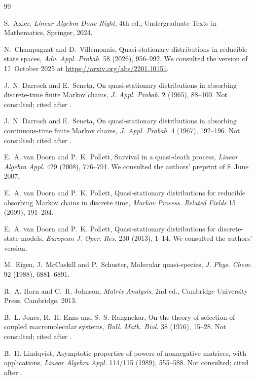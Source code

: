 \documentclass[11pt]{article}
\theoremstyle{definition}
\theoremstyle{remark}
\begin{document}
\begin{thebibliography}{99}

S.~Axler,
\emph{Linear Algebra Done Right}, 4th ed.,
Undergraduate Texts in Mathematics, Springer, 2024.

N.~Champagnat and D.~Villemonais,
Quasi-stationary distributions in reducible state spaces,
\emph{Adv. Appl. Probab.} 58 (2026), 956--992.
We consulted the version of 17~October 2025 at \url{https://arxiv.org/abs/2201.10151}.

J.~N. Darroch and E.~Seneta,
On quasi-stationary distributions in absorbing discrete-time finite Markov chains,
\emph{J. Appl. Probab.} 2 (1965), 88--100.
Not consulted; cited after \cite{vDP09,vDP13}.

J.~N. Darroch and E.~Seneta,
On quasi-stationary distributions in absorbing continuous-time finite Markov chains,
\emph{J. Appl. Probab.} 4 (1967), 192--196.
Not consulted; cited after \cite{vDP08,vDP13}.

E.~A. van Doorn and P.~K. Pollett,
Survival in a quasi-death process,
\emph{Linear Algebra Appl.} 429 (2008), 776--791.
We consulted the authors' preprint of 8~June 2007.

E.~A. van Doorn and P.~K. Pollett,
Quasi-stationary distributions for reducible absorbing Markov chains in discrete time,
\emph{Markov Process. Related Fields} 15 (2009), 191--204.

E.~A. van Doorn and P.~K. Pollett,
Quasi-stationary distributions for discrete-state models,
\emph{European J. Oper. Res.} 230 (2013), 1--14.
We consulted the authors' version.

M.~Eigen, J.~McCaskill and P.~Schuster,
Molecular quasi-species,
\emph{J. Phys. Chem.} 92 (1988), 6881--6891.

R.~A. Horn and C.~R. Johnson,
\emph{Matrix Analysis}, 2nd ed.,
Cambridge University Press, Cambridge, 2013.

B.~L. Jones, R.~H. Enns and S.~S. Rangnekar,
On the theory of selection of coupled macromolecular systems,
\emph{Bull. Math. Biol.} 38 (1976), 15--28.
Not consulted; cited after \cite{EMS88}.

B.~H. Lindqvist,
Asymptotic properties of powers of nonnegative matrices, with applications,
\emph{Linear Algebra Appl.} 114/115 (1989), 555--588.
Not consulted; cited after \cite{vDP08,vDP09}.


\end{thebibliography}
\end{document}
